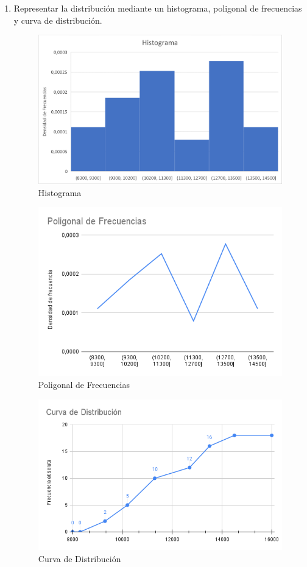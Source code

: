 \begin{ejercicio}
\begin{enumerate}
        \vspace{2cm}
        \item Representar la distribución mediante un histograma, poligonal de frecuencias y curva de distribución.
        \begin{figure}[H]
            \centering
            \includegraphics[width=0.6\linewidth]{Imagenes/Ej3_Histograma.png}
            \caption{Histograma}
        \end{figure}
        \begin{figure}[H]
            \centering
            \includegraphics[width=0.6\linewidth]{Imagenes/Ej3_Poligonal.png}
            \caption{Poligonal de Frecuencias}
        \end{figure}
        \begin{figure}[H]
            \centering
            \includegraphics[width=0.7\linewidth]{Imagenes/Ej3_Distribucion.png}
            \caption{Curva de Distribución}
        \end{figure}
        

\end{enumerate}
\end{ejercicio}
